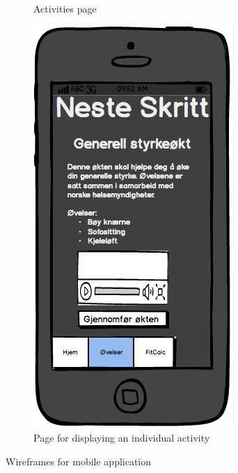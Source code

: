 \begin{figure}[H]
\begin{subfigure}{.5\textwidth}
  \caption{Activities page}
  \label{fig:appActivities}
\end{subfigure}%
\begin{subfigure}{.5\textwidth}
  \centering
  \includegraphics[width=.5\linewidth]{wireframes/app/Activity}
  \caption{Page for displaying an individual activity}
  \label{fig:appActivity}
\end{subfigure}
\caption{Wireframes for mobile application}
\end{figure} 



